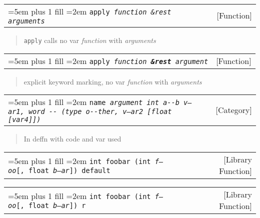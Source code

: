 \documentclass{book}
\newcommand\GNUTexinfocommandstyletextvar[1]{{\normalfont{}\textsl{#1}}}%
\begin{document}
\noindent\begin{tabularx}{\linewidth}{@{}Xr}
\rightskip=5em plus 1 fill
\hangindent=2em
\texttt{apply \EmbracOn{}\textnormal{\textsl{function \&rest arguments}}\EmbracOff{}}& [Function]
\end{tabularx}

%
\begin{quote}
\unskip{\parskip=0pt\noindent}%
\texttt{apply} calls no var \GNUTexinfocommandstyletextvar{function} with \GNUTexinfocommandstyletextvar{arguments}
\end{quote}


\noindent\begin{tabularx}{\linewidth}{@{}Xr}
\rightskip=5em plus 1 fill
\hangindent=2em
\texttt{apply \EmbracOn{}\textnormal{\textsl{function \EmbracOff{}\textnormal{\textbf{\&rest}}\EmbracOn{} argument}}\EmbracOff{}}& [Function]
\end{tabularx}

%
\begin{quote}
\unskip{\parskip=0pt\noindent}%
explicit keyword marking, no var \GNUTexinfocommandstyletextvar{function} with \GNUTexinfocommandstyletextvar{arguments}
\end{quote}


\noindent\begin{tabularx}{\linewidth}{@{}Xr}
\rightskip=5em plus 1 fill
\hangindent=2em
\texttt{name \EmbracOn{}\textnormal{\textsl{argument \texttt{int} \texttt{a{-}{-}b} \GNUTexinfocommandstyletextvar{v--ar1}, word \texttt{{-}{-}} (\texttt{type o{-}{-}ther}, \GNUTexinfocommandstyletextvar{v---ar2}  [\texttt{float} [\GNUTexinfocommandstyletextvar{var4}]])}}\EmbracOff{}}& [Category]
\end{tabularx}

%
\begin{quote}
\unskip{\parskip=0pt\noindent}%
In deffn with code and var used
\end{quote}


\noindent\begin{tabularx}{\linewidth}{@{}Xr}
\rightskip=5em plus 1 fill
\hangindent=2em
\texttt{int foobar (int\ \GNUTexinfocommandstyletextvar{f---oo}[,\ float\ \GNUTexinfocommandstyletextvar{b--ar}])\ default}& [Library Function]
\end{tabularx}

%

\noindent\begin{tabularx}{\linewidth}{@{}Xr}
\rightskip=5em plus 1 fill
\hangindent=2em
\texttt{int foobar (int\ \GNUTexinfocommandstyletextvar{f---oo}\textnormal{[},\ float\ \GNUTexinfocommandstyletextvar{b--ar}\textnormal{]})\ r}& [Library Function]
\end{tabularx}
\end{document}

